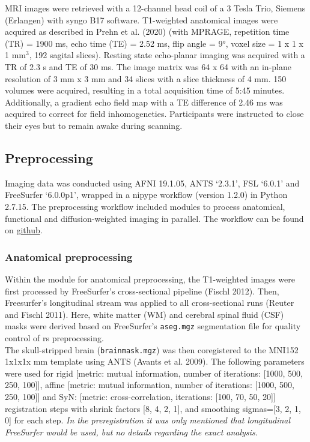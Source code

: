 \documentclass[
]{article}
\begin{document}
MRI images were retrieved with a 12-channel head coil of a 3 Tesla Trio, Siemens (Erlangen) with syngo B17 software.
T1-weighted anatomical images were acquired as described in Prehn et al. (2020) (with MPRAGE, repetition time (TR) = 1900 ms, echo time (TE) = 2.52 ms, flip angle = 9°, voxel size = 1 x 1 x 1 mm\(^3\), 192 sagital slices).
Resting state echo-planar imaging was acquired with a TR of 2.3 s and TE of 30 ms. The image matrix was 64 x 64 with an in-plane resolution of 3 mm x 3 mm and 34 slices with a slice thickness of 4 mm. 150 volumes were acquired, resulting in a total acquisition time of 5:45 minutes. Additionally, a gradient echo field map with a TE difference of 2.46 ms was acquired to correct for field inhomogeneties.
Participants were instructed to close their eyes but to remain awake during scanning.

\hypertarget{preprocessing}{%
\subsection{Preprocessing}\label{preprocessing}}

Imaging data was conducted using AFNI 19.1.05, ANTS `2.3.1', FSL `6.0.1' and FreeSurfer `6.0.0p1', wrapped in a nipype workflow (version 1.2.0) in Python 2.7.15.
The preprocessing workflow included modules to process anatomical, functional and diffusion-weighted imaging in parallel. The workflow can be found on \href{https://github.com/fBeyer89/ADI_preproc/}{github}.

\hypertarget{anatomical-preprocessing}{%
\subsubsection{Anatomical preprocessing}\label{anatomical-preprocessing}}

Within the module for anatomical preprocessing, the T1-weighted images were first processed by FreeSurfer's cross-sectional pipeline (Fischl 2012). Then, Freesurfer's longitudinal stream was applied to all cross-sectional runs (Reuter and Fischl 2011). Here, white matter (WM) and cerebral spinal fluid (CSF) masks were derived based on FreeSurfer's \texttt{aseg.mgz} segmentation file for quality control of rs preprocessing.\\
The skull-stripped brain (\texttt{brainmask.mgz}) was then coregistered to the MNI152 1x1x1x mm template using ANTS (Avants et al. 2009). The following parameters were used for rigid {[}metric: mutual information, number of iterations: {[}1000, 500, 250, 100{]}{]}, affine {[}metric: mutual information, number of iterations: {[}1000, 500, 250, 100{]}{]} and SyN: {[}metric: cross-correlation, iterations: {[}100, 70, 50, 20{]}{]} registration steps with shrink factors {[}8, 4, 2, 1{]}, and smoothing sigmas={[}3, 2, 1, 0{]} for each step.
\emph{In the preregistration it was only mentioned that longitudinal FreeSurfer would be used, but no details regarding the exact analysis.}
\end{document}
